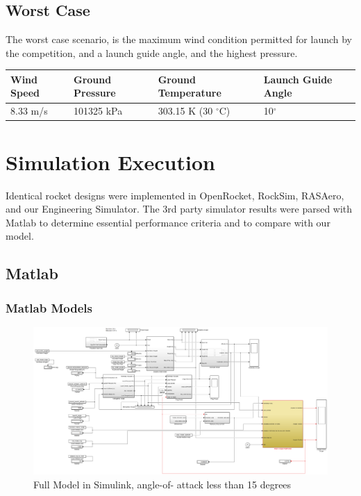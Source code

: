 \documentclass[]{book}
\begin{document}

\subsection{Worst Case}\label{worst-case}

The worst case scenario, is the maximum wind condition permitted for
launch by the competition, and a launch guide angle, and the highest
pressure.

\begin{longtable}[c]{@{}llll@{}}
\toprule
Wind Speed & Ground Pressure & Ground Temperature & Launch Guide
Angle\tabularnewline
\midrule
\endhead
8.33 m/s & 101325 kPa & 303.15 K (30 \(^\circ\)C) &
10\(^\circ\)\tabularnewline
\bottomrule
\end{longtable}


\clearpage

\section{Simulation Execution}\label{simulation-execution-1}

Identical rocket designs were implemented in OpenRocket, RockSim,
RASAero, and our Engineering Simulator. The 3rd party simulator results
were parsed with Matlab to determine essential performance criteria and
to compare with our model.

\clearpage

\subsection{Matlab}\label{matlab}

\subsubsection{Matlab Models}\label{matlab-models}

\begin{figure}[htbp]
\centering
\includegraphics{images/rocket_model.png}
\caption{Full Model in Simulink, angle-of- attack less than 15 degrees
\label{full_model_test_label}}
\end{figure}
\end{document}
